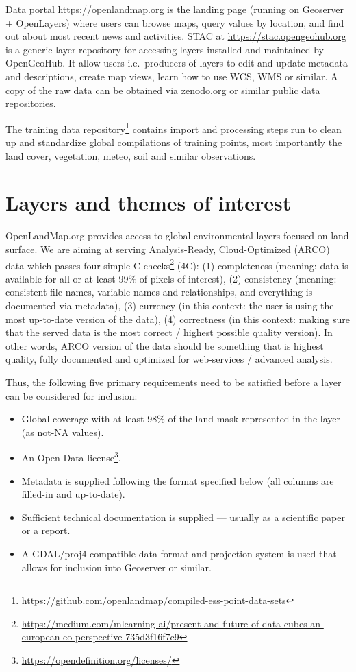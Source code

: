 \documentclass[
  graybox,natbib,nospthms]{svmono}
\providecommand{\tightlist}{%
  \setlength{\itemsep}{0pt}\setlength{\parskip}{0pt}}
\providecommand{\tightlist}{\setlength{\itemsep}{0pt}\setlength{\parskip}{0pt}}
\renewcommand{\href}[2]{#2 (\url{#1})}
\renewcommand{\href}[2]{#2\footnote{\url{#1}}}
\begin{document}
Data portal \url{https://openlandmap.org} is the landing page (running on Geoserver + OpenLayers) where users can browse maps, query values by
location, and find out about most recent news and activities. STAC at \url{https://stac.opengeohub.org}
is a generic layer repository for accessing layers installed and maintained by OpenGeoHub.
It allow users i.e.~producers of layers to edit and update metadata and descriptions,
create map views, learn how to use WCS, WMS or similar. A copy of the raw data can be obtained
via zenodo.org or similar public data repositories.

The \href{https://github.com/openlandmap/compiled-ess-point-data-sets}{training data repository} contains
import and processing steps run to clean up and standardize global compilations of training
points, most importantly the land cover, vegetation, meteo, soil and similar observations.

\hypertarget{layers-and-themes-of-interest}{%
\section{Layers and themes of interest}\label{layers-and-themes-of-interest}}

OpenLandMap.org provides access to global environmental layers focused on land surface.
We are aiming at serving Analysis-Ready, Cloud-Optimized (ARCO) data which passes \href{https://medium.com/mlearning-ai/present-and-future-of-data-cubes-an-european-eo-perspective-735d3f16f7c9}{four simple C checks} (4C):
(1) completeness (meaning: data is available for all or at least 99\% of pixels of interest),
(2) consistency (meaning: consistent file names, variable names and relationships,
and everything is documented via metadata), (3) currency (in this context: the user
is using the most up-to-date version of the data), (4) correctness (in this context:
making sure that the served data is the most correct / highest possible quality version).
In other words, ARCO version of the data should be something that is highest quality,
fully documented and optimized for web-services / advanced analysis.

Thus, the following five primary requirements need to be satisfied before a layer can be considered for inclusion:

\begin{itemize}
\tightlist
\item
  Global coverage with at least 98\% of the land mask represented in the layer (as not-NA values).
\item
  An \href{https://opendefinition.org/licenses/}{Open Data license}.
\item
  Metadata is supplied following the format specified below (all columns are filled-in and up-to-date).
\item
  Sufficient technical documentation is supplied --- usually as a scientific paper or a report.
\item
  A GDAL/proj4-compatible data format and projection system is used that allows for inclusion into Geoserver or similar.
\end{itemize}
\end{document}
